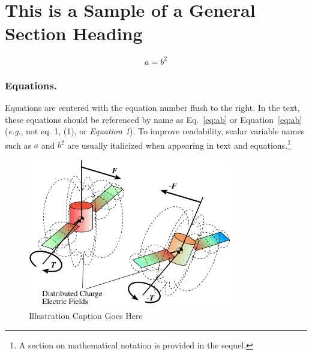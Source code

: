 \documentclass[letterpaper, preprint, paper,11pt]{AAS}	%
\begin{document}





\section{This is a Sample of a General Section Heading}

\begin{equation}
	\label{eq:ab}
	a = b^{2}
\end{equation}

\subsubsection{Equations.} 
Equations are centered with the equation number flush to the right. In the text, these equations should be referenced by name as Eq.~\eqref{eq:ab} or Equation~\eqref{eq:ab} (\emph{e.g}., not eq. 1, (1), or \emph{Equation 1}). To improve readability, scalar variable names such as $a$ and $b^{2}$ are usually italicized when appearing in text and equations.\footnote{A section on mathematical notation is provided in the sequel.}

\begin{figure}[htb]
	\centering\includegraphics[width=3.5in]{Figures/test}
	\caption{Illustration Caption Goes Here}
	\label{fig:xxx}
\end{figure}
\end{document}

